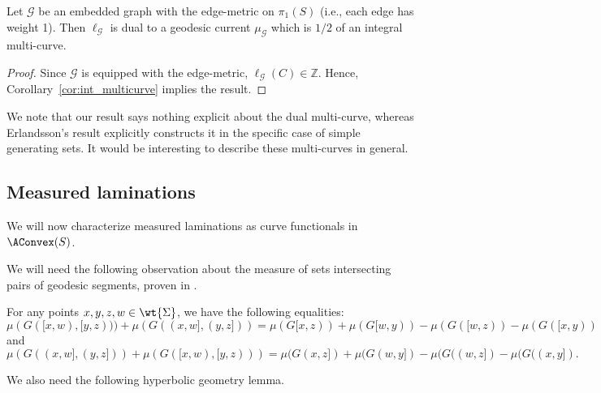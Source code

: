 \begin{corollary}
Let $\mathcal{G}$ be an embedded graph with the edge-metric on $\pi_1(S)$ (i.e., each edge has weight 1). Then $\ell_{\mathcal{G}}$ is dual to a geodesic current $\mu_{\mathcal{G}}$ which is $1/2$ of an integral multi-curve.
\label{cor:generalization_wordlength}
\end{corollary}
\begin{proof}
Since $\mathcal{G}$ is equipped with the edge-metric, $\ell_{\mathcal{G}}(C) \in \mathbb{Z}$.
Hence, Corollary~\ref{cor:int_multicurve} implies the result.
\end{proof}

We note that our result says nothing explicit about the dual multi-curve, whereas Erlandsson's result explicitly constructs it in the specific case of simple generating sets. It would be interesting to describe these multi-curves in general.

\subsection{Measured laminations}

We will now characterize measured laminations as curve functionals in $\AConvex(S)$.

We will need the following observation about the measure of sets intersecting pairs of geodesic segments, proven in \cite[Lemma~6.2]{dRMG22:Duals}.

\begin{lemma}
For any points $x,y,z,w \in \wt{\Sigma}$, we have the following equalities:
\begin{equation*}
\mu(G([{x},{w}), [{y},{z}))) +  \mu(G(({x},{w}], ({y},{z}])) = 
\mu(G[{x},{z})) + \mu(G[{w},{y})) - \mu(G([{w},{z})) - \mu(G([{x},{y}))
\end{equation*}
and
\begin{equation*}
\mu(G(({x},{w}], ({y},{z}])) +   \mu(G([{x},{w}), [{y},{z})))= 
\mu(G({x},{z}]) + \mu(G({w},{y}]) - \mu(G(({w},{z}]) - \mu(G(({x},{y}]).
\end{equation*}
\label{lem:otalclaim}
\end{lemma}

We also need the following hyperbolic geometry lemma.

